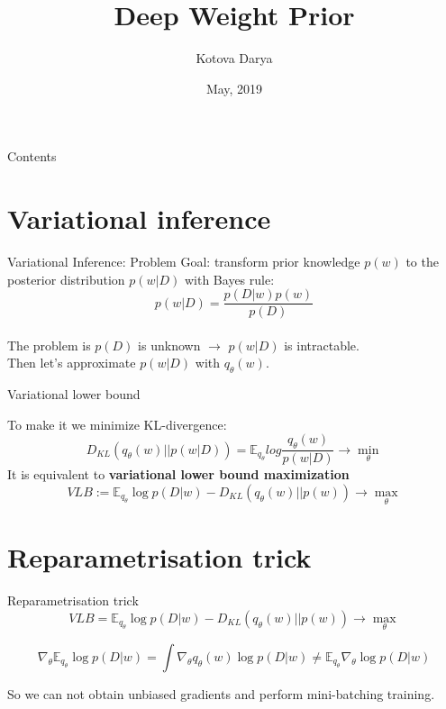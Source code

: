 \documentclass[19pt]{beamer}
\title{Deep Weight Prior}
\author{Kotova Darya}
\institute[MIPT] %
\date{May, 2019}
\begin{document}
\begin{frame}
  \titlepage
\end{frame}

\begin{frame}{Contents}
  \tableofcontents
\end{frame}

\section{Variational inference}

\begin{frame}{Variational Inference: Problem}
Goal: transform prior knowledge $p(w)$ to the posterior distribution $p(w \vert D)$ with Bayes rule:\\
$$
p(w \vert D) = \frac{p(D \vert w) p(w)}{p(D)}
$$\\
The problem is $p(D)$ is unknown $\rightarrow$ $p(w \vert D)$ is intractable. \\
Then let's approximate $p(w \vert D)$ with $q_{\theta}(w)$.
\end{frame}

\begin{frame}{Variational lower bound}

To make it we minimize KL-divergence:\\
$$
D_{KL}(q_{\theta}(w) \vert \vert p(w \vert D)) = \mathbb{E}_{q_{\theta}}log\frac{q_{\theta}(w)}{p(w \vert  D)} \rightarrow \min_{\theta}
$$ 
It is equivalent to \textbf{variational lower bound maximization}
$$
VLB := \mathbb{E}_{q_{\theta}} \log p(D \vert w) - D_{KL}(q_{\theta}(w) \vert \vert p(w)) \rightarrow \max_{\theta}
$$
\end{frame}

\section{Reparametrisation trick}

\begin{frame}{Reparametrisation trick}
$$
VLB = \mathbb{E}_{q_{\theta}} \log p(D \vert w) - D_{KL}(q_{\theta}(w) \vert \vert p(w)) \rightarrow \max_{\theta}
$$

$$ 
\nabla_{\theta} \mathbb{E}_{q_{\theta}} \log p(D| w) = \int \nabla_{\theta} q_{\theta}(w) \log p(D \vert w)  \neq \mathbb{E}_{q_{\theta}} \nabla_{\theta} \log p(D \vert w)
$$

So we can not obtain unbiased gradients and perform mini-batching training. \\

\end{frame}
\end{document}
